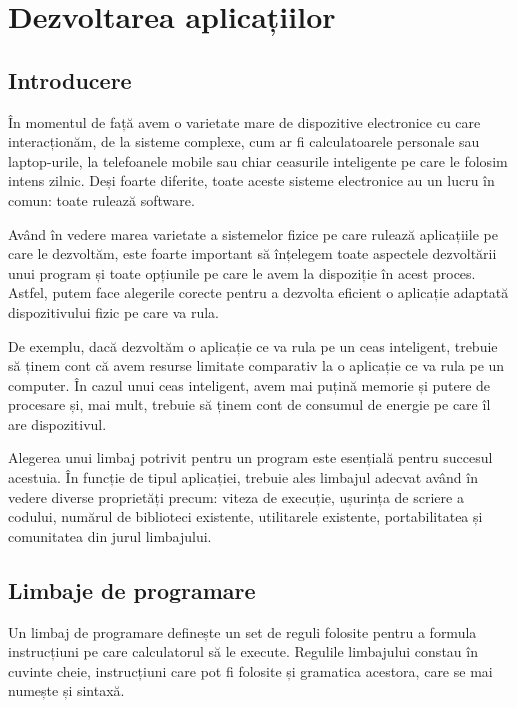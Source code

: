 \chapter{Dezvoltarea aplicațiilor}
\label{chapter:appdev}

\section{Introducere}
\label{sec:appdev-intro}

În momentul de față avem o varietate mare de dispozitive electronice cu care
interacționăm, de la sisteme complexe, cum ar fi calculatoarele personale sau
laptop-urile, la telefoanele mobile sau chiar ceasurile inteligente pe care le
folosim intens zilnic. Deși foarte diferite, toate aceste sisteme electronice au
un lucru în comun: toate rulează software.

Având în vedere marea varietate a sistemelor fizice pe care rulează aplicațiile
pe care le dezvoltăm, este foarte important să înțelegem toate aspectele
dezvoltării unui program și toate opțiunile pe care le avem la dispoziție în
acest proces. Astfel, putem face alegerile corecte pentru a dezvolta eficient o
aplicație adaptată dispozitivului fizic pe care va rula.

De exemplu, dacă dezvoltăm o aplicație ce va rula pe un ceas inteligent, trebuie
să ținem cont că avem resurse limitate comparativ la o aplicație ce va rula pe
un computer. În cazul unui ceas inteligent, avem mai puțină memorie și putere de
procesare și, mai mult, trebuie să ținem cont de consumul de energie pe care îl
are dispozitivul.

Alegerea unui limbaj potrivit pentru un program este esențială pentru succesul
acestuia. În funcție de tipul aplicației, trebuie ales limbajul adecvat având în
vedere diverse proprietăți precum: viteza de execuție, ușurința de scriere a
codului, numărul de biblioteci existente, utilitarele existente, portabilitatea
și comunitatea din jurul limbajului.

\section{Limbaje de programare}
\label{sec:appdev-langs}

Un limbaj de programare definește un set de reguli folosite pentru a formula
instrucțiuni pe care calculatorul să le execute. Regulile limbajului constau în
cuvinte cheie, instrucțiuni care pot fi folosite și gramatica acestora, care se
mai numește și sintaxă.

